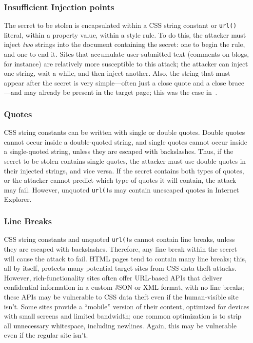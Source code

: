 \documentclass{sig-alternate}
\begin{document}
\subsubsection{Insufficient Injection points}
The secret to be stolen is encapsulated within a CSS string constant
or \verb|url()| literal, within a property value, within a style rule.
To do this, the attacker must inject \emph{two} strings into the
document containing the secret: one to begin the rule, and one to end
it. Sites that accumulate user-submitted text (comments on blogs, for
instance) are relatively more susceptible to this attack; the attacker
can inject one string, wait a while, and then inject another.  Also,
the string that must appear after the secret is very simple---often
just a close quote and a close brace---and may already be present in
the target page; this was the case in~\cite{cssxss08}.

\subsubsection{Quotes}
CSS string constants can be written with single or double
quotes. Double quotes cannot occur inside a double-quoted string, and
single quotes cannot occur inside a single-quoted string, unless they
are escaped with backslashes. Thus, if the secret to be stolen
contains single quotes, the attacker must use double quotes in their
injected strings, and vice versa. If the secret contains both types of
quotes, or the attacker cannot predict which type of quotes it will
contain, the attack may fail. However, unquoted \texttt{url()}s may
contain unescaped quotes in Internet Explorer.

\subsubsection{Line Breaks} \label{sec:linebreaks}
CSS string constants and unquoted \texttt{url()}s cannot contain line
breaks, unless they are escaped with backslashes. Therefore, any line
break within the secret will cause the attack to fail. HTML pages tend
to contain many line breaks; this, all by itself, protects many
potential target sites from CSS data theft attacks. However,
rich-functionality sites often offer URL-based APIs that deliver
confidential information in a custom JSON or XML format, with no line
breaks; these APIs may be vulnerable to CSS data theft even if the
human-visible site isn't.  Some sites provide a “mobile” version of
their content, optimized for devices with small screens and limited
bandwidth; one common optimization is to strip all unnecessary
whitespace, including newlines.  Again, this may be vulnerable even if
the regular site isn't.
\end{document}
